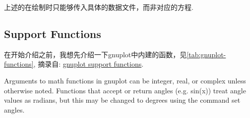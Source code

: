 \begin{remark}
上述的\cmd{\StairsPlot, \StemPlot, \BarPlot, \ShadePlot}在绘制时只能够传入具体的数据文件，而非对应的方程.
\end{remark}

\subsection{Support Functions}
在开始介绍之前，我想先介绍一下gnuplot中内建的函数，见\cref{tab:gnuplot-functions},
摘录自: \href{http://www.bersch.net/gnuplot-doc/expressions.html#expressions-functions-floor}{gnuplot support functions}.

\begin{leftbar}
    Arguments to math functions in gnuplot can be integer, real, or complex unless otherwise noted.
    Functions that accept or return angles (e.g. sin(x)) treat angle values as radians, but this may 
    be changed to degrees using the command set angles.
\end{leftbar}

